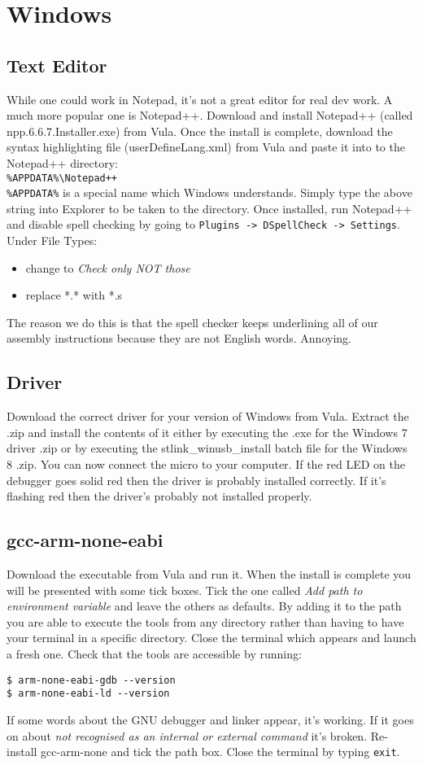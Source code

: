 \section{Windows}
\subsection{Text Editor}
While one could work in Notepad, it's not a great editor for real dev work. A much more popular one is Notepad++. Download and install Notepad++ (called npp.6.6.7.Installer.exe) from Vula. 
Once the install is complete, download the syntax highlighting file (userDefineLang.xml) from Vula and paste it into to the Notepad++ directory: \\
\verb;%APPDATA%\Notepad++;\\
\verb+%APPDATA%+ is a special name which Windows understands. Simply type the above string into Explorer to be taken to the directory. 
Once installed, run Notepad++ and disable spell checking by going to \verb+Plugins -> DSpellCheck -> Settings+. 
Under File Types:
\begin{itemize}
\item change to \textit{Check only NOT those}
\item replace   *.*   with   *.s
\end{itemize}
The reason we do this is that the spell checker keeps underlining all of our assembly instructions because they are not English words. Annoying.

\subsection{Driver}
Download the correct driver for your version of Windows from Vula. Extract the .zip and install the contents of it either by executing the .exe for the Windows 7 driver .zip or by executing the stlink\_winusb\_install batch file for the Windows 8 .zip.
You can now connect the micro to your computer. If the red LED on the debugger goes solid red then the driver is probably installed correctly. If it's flashing red then the driver's probably not installed properly. 

\subsection{gcc-arm-none-eabi}
Download the executable from Vula and run it. When the install is complete you will be presented with some tick boxes. Tick the one called \textit{Add path to environment variable} and leave the others as defaults. By adding it to the path you are able to execute the tools from any directory rather than having to have your terminal in a specific directory. 
Close the terminal which appears and launch a fresh one. Check that the tools are accessible by running:
\begin{lstlisting}[style=BashStyle]
$ arm-none-eabi-gdb --version
$ arm-none-eabi-ld --version
\end{lstlisting}
If some words about the GNU debugger and linker appear, it's working. 
If it goes on about \textit{not recognised as an internal or external command} it's broken. Re-install gcc-arm-none and tick the path box.
Close the terminal by typing \texttt{exit}.


